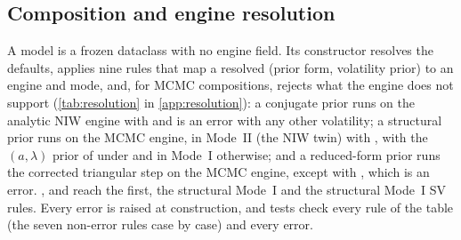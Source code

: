 \subsection{Composition and engine resolution}\label{sec:arch-resolution}

A model is a frozen dataclass  with no
engine field.
Its constructor resolves the  defaults, applies nine rules that map a resolved
(prior form, volatility prior) to an engine and mode, and, for MCMC compositions, rejects what the
engine does not support (\cref{tab:resolution} in \cref{app:resolution}): a conjugate prior runs
on the analytic NIW engine with  and is an error with any other volatility; a
structural prior runs on the MCMC engine, in Mode~II (the NIW twin) with , with
the $(a, \lambda)$ prior of \citet{chan2022asymmetric} under  and in
Mode~I otherwise; and a reduced-form prior runs the corrected triangular step on the MCMC engine,
except with , which is an error. , 
and  reach the first, the structural Mode~I  and the structural
Mode~I SV rules. %
Every error is raised at construction, and tests check every rule of the table (the seven
non-error rules case by case) and every error. %


